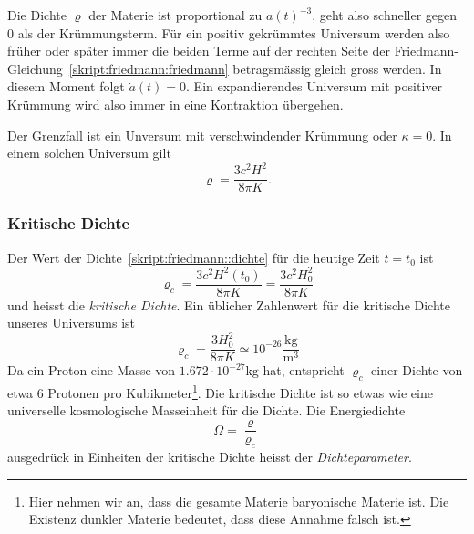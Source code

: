 Die Dichte $\varrho$ der Materie ist proportional zu $a(t)^{-3}$, geht
also schneller gegen $0$ als der Krümmungsterm.
Für ein positiv gekrümmtes Universum werden also früher oder später immer
die beiden Terme auf der rechten Seite der
Friedmann-Gleichung~\eqref{skript:friedmann:friedmann}
betragsmässig gleich gross werden.
In diesem Moment folgt $\dot a(t) = 0$.
Ein expandierendes Universum mit positiver Krümmung wird also immer in eine 
Kontraktion übergehen.

Der Grenzfall ist ein Unversum mit verschwindender Krümmung oder $\kappa=0$.
In einem solchen Universum gilt
\begin{equation}
\varrho = \frac{3c^2H^2}{8\pi K}.
\label{skript:friedmann::dichte}
\end{equation}

\subsubsection{Kritische Dichte}
Der Wert der Dichte~\eqref{skript:friedmann::dichte}
für die heutige Zeit $t=t_0$ ist
\[
\varrho_c = \frac{3c^2H^2(t_0)}{8\pi K}=\frac{3c^2H_0^2}{8\pi K}
\]
und heisst die {\em kritische Dichte}.
%
%
Ein üblicher Zahlenwert für die kritische Dichte unseres Universums ist
\[
\varrho_c = \frac{3H_0^2}{8\pi K}\simeq 10^{-26}\frac{\text{kg}}{\text{m}^3}
\]
Da ein Proton eine Masse von $1.672\cdot 10^{-27}\text{kg}$ hat, entspricht
$\varrho_c$ einer Dichte von etwa $6$ Protonen pro Kubikmeter\footnote{%
Hier nehmen wir an, dass die gesamte Materie baryonische Materie ist.
Die Existenz dunkler Materie bedeutet, dass diese Annahme falsch ist.
}.
Die kritische Dichte ist so etwas wie eine universelle kosmologische
Masseinheit für die Dichte.
Die Energiedichte
\[
\Omega=\frac{\varrho}{\varrho_c}
\]
ausgedrück in Einheiten der kritische Dichte heisst
der {\em Dichteparameter}.
%

